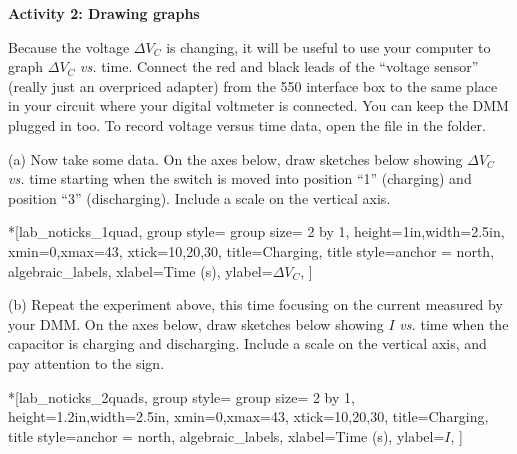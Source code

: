 \textbf{Activity 2: Drawing graphs}

Because the voltage $\Delta V_C$ is changing, it will be useful to use your computer to graph $\Delta V_C$ \textit{vs.} time.  Connect the red and black leads of the ``voltage sensor'' (really just an overpriced adapter) from the 550 interface box to the same place in your circuit where your digital voltmeter is connected.  You can keep the DMM plugged in too.
To record voltage versus time data, open the file  in the \filename{\coursefolder} folder.

(a)  Now take some data.  On the axes below, draw sketches below showing $\Delta V_C$ \textit{vs.} time starting when the switch is moved into position ``1'' (charging) and position ``3'' (discharging).  Include a scale on the vertical axis.


\begin{lab_groupplot}*{}[lab_noticks_1quad,
	group style={
		group size= 2 by 1},
	height=1in,width=2.5in,
	xmin=0,xmax=43,
	xtick={10,20,30},
	title=Charging,
	title style={anchor = north},
	algebraic_labels,
	xlabel=Time (s),
	ylabel=$\Delta V_C$,
]
\nextgroupplot[title=Charging]
\nextgroupplot[title=Discharging]
\end{lab_groupplot}


(b) Repeat the experiment above, this time focusing on the current measured by your DMM.  On the axes below, draw sketches below showing $I$ \textit{vs.} time when the capacitor is charging and discharging.  Include a scale on the vertical axis, and pay attention to the sign.


\begin{lab_groupplot}*{}[lab_noticks_2quads,
	group style={
		group size= 2 by 1},
	height=1.2in,width=2.5in,
	xmin=0,xmax=43,
	xtick={10,20,30},
	title=Charging,
	title style={anchor = north},
	algebraic_labels,
	xlabel=Time (s),
	ylabel=\hspace*{15.71pt}$I$,  %
]
\nextgroupplot[title=Charging]
\nextgroupplot[title=Discharging]
\end{lab_groupplot}

